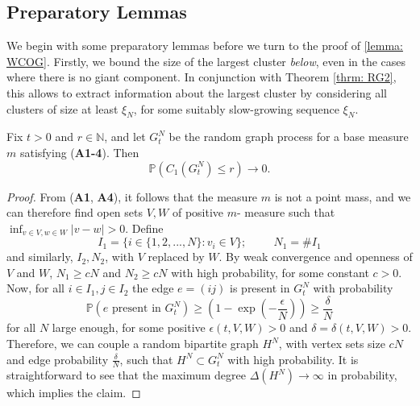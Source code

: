 \subsection{Preparatory Lemmas} We begin with some preparatory lemmas before we turn to the proof of \ref{lemma: WCOG}. Firstly, we  bound the size of the largest cluster \emph{below}, even in the cases where there is no giant component. In conjunction with Theorem \ref{thrm: RG2}, this allows to extract information about the largest cluster by considering all clusters of size at least $\xi_N$, for some suitably slow-growing sequence $\xi_N$.
\begin{lemma}\label{lemma: lower bound on largest cluster} Fix $t>0$ and $r\in \mathbb{N}$, and let $G^N_t$ be the random graph process for a base measure $m$ satisfying (\textbf{A1-4}). Then \begin{equation}
    \mathbb{P}(C_1(G^N_t)\leq r)\rightarrow 0.
\end{equation} \end{lemma} \begin{proof} From (\textbf{A1}, \textbf{A4}), it follows that the measure $m$ is not a point mass, and we can therefore find open sets $V, W$ of positive $m$- measure such that $\inf_{v \in V, w \in W} |v-w|>0$. Define \begin{equation} I_1=\{i \in \{1,2,...,N\}: v_i \in V\}; \hspace{1cm} N_1=\#I_1
\end{equation} and similarly, $I_2, N_2$, with $V$ replaced by $W$. By weak convergence and openness of $V$ and $W$, $N_1\geq cN$ and $N_2\geq cN$ with high probability, for some constant $c>0$. Now, for all $i\in I_1, j\in I_2$ the edge $e=(ij)$ is present in $G^N_t$ with probability \begin{equation}
    \mathbb{P}(e \text{ present in }G^N_t) \geq \left(1-\exp\left(-\frac{\epsilon}{N}\right)\right) \geq \frac{\delta}{N}
\end{equation} for all $N$ large enough, for some positive $\epsilon(t, V, W)>0$ and $\delta=\delta(t, V, W)>0$. \medskip \\ Therefore, we can couple a random bipartite graph $H^N$, with vertex sets size $cN$ and edge probability $\frac{\delta}{N}$, such that $H^N \subset G^N_t$ with high probability. It is straightforward to see that the maximum degree $\Delta(H^N)\rightarrow \infty$ in probability, which implies the claim.   \end{proof}

